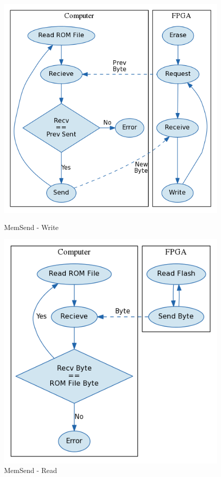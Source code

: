 \documentclass{article}
\begin{document}
\begin{figure}[H]
    \centering
    \begin{minipage}[H]{0.45\linewidth}
        \centering
        \includegraphics[width=\textwidth]{../../fpga/rom_flasher/doc/block_diagram_write.png}
        \caption{MemSend - Write}
        \label{fig:rom_write}
    \end{minipage}
    \hspace{0.5cm}
    \begin{minipage}[H]{0.45\linewidth}
        \centering
        \includegraphics[width=\textwidth]{../../fpga/rom_flasher/doc/block_diagram_read.png}
        \caption{MemSend - Read}
        \label{fig:rom_read}
    \end{minipage}
\end{figure}
\end{document}
